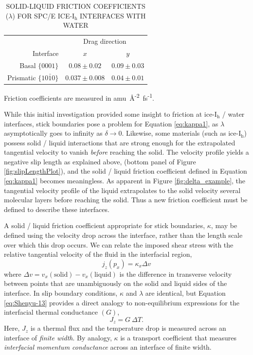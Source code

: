 \begin{table}[h]
\centering
\caption{SOLID-LIQUID FRICTION COEFFICIENTS ($\lambda$) FOR SPC/E
  ICE-I$_\mathrm{h}$ INTERFACES WITH WATER }
\label{tab:lambda}
\begin{tabular}{r|cc}  
\hline
\hline
           & \multicolumn{2}{c}{Drag direction} \\ 
 Interface & $x$               & $y$  \\ \hline
     Basal  $\{0001\}$ &  $0.08 \pm 0.02$  & $0.09 \pm 0.03$ \\
 Prismatic  $\{10\bar{1}0\}$ & $0.037 \pm 0.008$ & $0.04 \pm 0.01$ \\ 
\hline
\hline
\end{tabular}
\begin{flushleft}
  Friction coefficients are measured in
  amu~\AA\textsuperscript{-2}~fs\textsuperscript{-1}.
\end{flushleft}
\end{table}



While this initial investigation provided some insight to friction at
ice-I$_\mathrm{h}$ / water interfaces, stick boundaries pose a problem
for Equation  \eqref{eq:kappa1}, as $\lambda$ asymptotically goes to
infinity as $\delta \rightarrow 0$.  Likewise, some materials (such as
ice-I$_\mathrm{h}$) possess solid / liquid interactions that are
strong enough for the extrapolated tangential velocity to vanish
\textit{before} reaching the solid. The velocity profile yields a
negative slip length as explained above, (bottom panel of Figure
\ref{fig:slipLengthPlot}), and the solid / liquid friction coefficient
defined in Equation \eqref{eq:kappa1} becomes meaningless.  As apparent in
Figure \ref{fig:delta_example}, the tangential velocity profile of the
liquid extrapolates to the solid velocity several molecular layers
before reaching the solid. Thus a new friction coefficient must be
defined to describe these interfaces.

A solid / liquid friction coefficient appropriate for stick
boundaries, $\kappa$, may be defined using the velocity drop
across the interface, rather than the length scale over which this
drop occurs. We can relate the imposed shear stress with the relative
tangential velocity of the fluid in the interfacial
region,\cite{Kuang2012}
\begin{equation}\label{eq:Shenyu-13}
j_{z}(p_{x}) = \kappa_{x} \Delta v
\end{equation}
where $\Delta v = v_{x}(\mathrm{solid}) - v_{x}(\mathrm{liquid})$ is
the difference in transverse velocity between points that are
unambiguously on the solid and liquid sides of the interface.  In slip
boundary conditions, $\kappa$ and $\lambda$ are identical, but
Equation \eqref{eq:Shenyu-13} provides a direct analogy to non-equilibrium
expressions for the interfacial thermal conductance $(G)$,
\begin{equation}
J_z = G~ \Delta T.
\end{equation}
Here, $J_z$ is a thermal flux and the temperature drop is measured
across an interface of \textit{finite width}. By analogy, $\kappa$ is
a transport coefficient that measures \textit{interfacial momentum
  conductance} across an interface of finite width.

